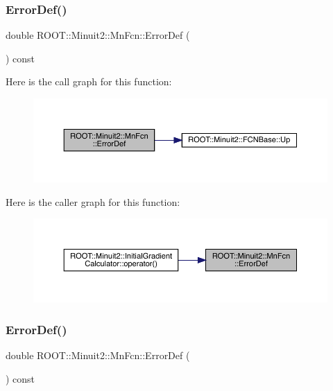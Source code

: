 \subsubsection{\texorpdfstring{ErrorDef()}{ErrorDef()}\hspace{0.1cm}{\footnotesize\ttfamily [1/3]}}
{\footnotesize\ttfamily double R\+O\+O\+T\+::\+Minuit2\+::\+Mn\+Fcn\+::\+Error\+Def (\begin{DoxyParamCaption}{ }\end{DoxyParamCaption}) const}

Here is the call graph for this function\+:
\nopagebreak
\begin{figure}[H]
\begin{center}
\leavevmode
\includegraphics[width=350pt]{de/d0e/classROOT_1_1Minuit2_1_1MnFcn_abca32e4dd5ef187be7e099df14b4b54a_cgraph}
\end{center}
\end{figure}
Here is the caller graph for this function\+:
\nopagebreak
\begin{figure}[H]
\begin{center}
\leavevmode
\includegraphics[width=350pt]{de/d0e/classROOT_1_1Minuit2_1_1MnFcn_abca32e4dd5ef187be7e099df14b4b54a_icgraph}
\end{center}
\end{figure}
\mbox{\label{classROOT_1_1Minuit2_1_1MnFcn_abca32e4dd5ef187be7e099df14b4b54a}} 
\subsubsection{\texorpdfstring{ErrorDef()}{ErrorDef()}\hspace{0.1cm}{\footnotesize\ttfamily [2/3]}}
{\footnotesize\ttfamily double R\+O\+O\+T\+::\+Minuit2\+::\+Mn\+Fcn\+::\+Error\+Def (\begin{DoxyParamCaption}{ }\end{DoxyParamCaption}) const}

